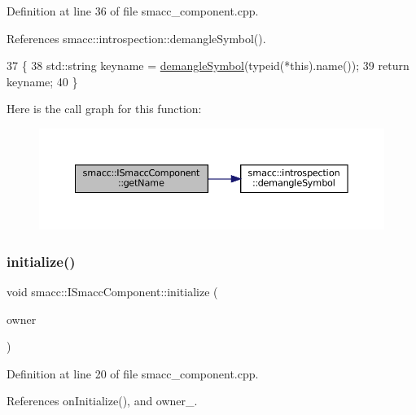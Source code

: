 Definition at line 36 of file smacc\+\_\+component.\+cpp.



References smacc\+::introspection\+::demangle\+Symbol().


\begin{DoxyCode}
37 \{
38     std::string keyname = \hyperlink{namespacesmacc_1_1introspection_a2f495108db3e57604d8d3ff5ef030302}{demangleSymbol}(\textcolor{keyword}{typeid}(*this).name());
39     \textcolor{keywordflow}{return} keyname;
40 \}
\end{DoxyCode}
Here is the call graph for this function\+:
\nopagebreak
\begin{figure}[H]
\begin{center}
\leavevmode
\includegraphics[width=350pt]{classsmacc_1_1ISmaccComponent_a8bfa94b1b1c616d55837ebba1b426c6e_cgraph}
\end{center}
\end{figure}
\mbox{\label{classsmacc_1_1ISmaccComponent_a3378552cb1a86aa26a07c0edc057448b}} 
\subsubsection{\texorpdfstring{initialize()}{initialize()}}
{\footnotesize\ttfamily void smacc\+::\+I\+Smacc\+Component\+::initialize (\begin{DoxyParamCaption}\item[{\hyperlink{classsmacc_1_1ISmaccClient}{I\+Smacc\+Client} $\ast$}]{owner }\end{DoxyParamCaption})\hspace{0.3cm}{\ttfamily [protected]}}



Definition at line 20 of file smacc\+\_\+component.\+cpp.



References on\+Initialize(), and owner\+\_\+.



